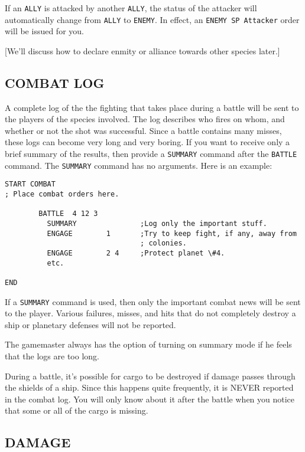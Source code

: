 \documentclass[10pt,titlepage]{article}
\begin{document}
If an \texttt{ALLY} is attacked by another \texttt{ALLY}, the status of the attacker will
automatically change from \texttt{ALLY} to \texttt{ENEMY}.  In effect, an \texttt{ENEMY SP Attacker}
order will be issued for you.

[We'll discuss how to declare enmity or alliance towards other species later.]


\subsection{COMBAT LOG}
\label{sec:combatlog}


A complete log of the the fighting that takes place during a battle will be
sent to the players of the species involved.  The log describes who fires on
whom, and whether or not the shot was successful.  Since a battle contains
many misses, these logs can become very long and very boring.  If you want to
receive only a brief summary of the results, then provide a \texttt{SUMMARY} command
after the \texttt{BATTLE} command.  The \texttt{SUMMARY} command has no arguments.  Here is an
example:

\begin{verbatim}
START COMBAT
; Place combat orders here.

        BATTLE  4 12 3
          SUMMARY               ;Log only the important stuff.
          ENGAGE        1       ;Try to keep fight, if any, away from
                                ; colonies.
          ENGAGE        2 4     ;Protect planet \#4.
          etc.

END\end{verbatim} 

If a \texttt{SUMMARY} command is used, then only the important combat news will be sent
to the player.  Various failures, misses, and hits that do not completely
destroy a ship or planetary defenses will not be reported.

The gamemaster always has the option of turning on summary mode if he feels
that the logs are too long.

During a battle, it's possible for cargo to be destroyed if damage passes
through the shields of a ship.  Since this happens quite frequently, it is
NEVER reported in the combat log.  You will only know about it after the battle
when you notice that some or all of the cargo is missing.


\subsection{DAMAGE}
\label{sec:damage}
\end{document}

